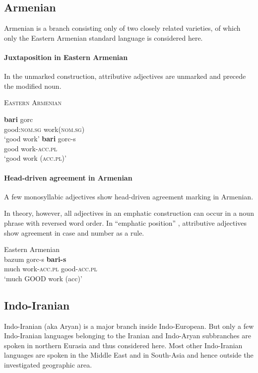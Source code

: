 \subsection{Armenian}
Armenian is a branch consisting only of two closely related varieties, of which only the Eastern Armenian standard language is considered here.

\paragraph{Juxtaposition in Eastern Armenian} 
In the unmarked construction, attributive adjectives are unmarked and precede the modified noun.
\begin{exe}
\ex \textsc{Eastern Armenian} \citep{ajello1998}
\begin{xlist}
\ex 
\gll	\textbf{bari} gorc\\
	good:\textsc{nom.sg} work(\textsc{nom.sg})\\
\glt	‘good work’
\ex 
\gll	\textbf{bari} gorc-s\\
	good work-\textsc{acc.pl}\\
\glt	‘good work (\textsc{acc.pl})’
\end{xlist}
\end{exe}

\paragraph{Head-driven agreement in Armenian}
A few monosyllabic adjectives show head-driven agreement marking in Armenian. 

In theory, however, all adjectives in an emphatic construction can occur in a noun phrase with reversed word order. In “emphatic position” \cite[224]{ajello1998}, attributive adjectives show agreement in case and number as a rule.
\begin{exe}
\ex \rm{Eastern Armenian \citep[224]{ajello1998}}\\
\gll	bazum gorc-s \textbf{bari-s}\\
	much work-\textsc{acc.pl} good-\textsc{acc.pl}\\
\glt	‘much GOOD work (acc)’
\end{exe}

\subsection{Indo-Iranian}
Indo-Iranian (aka Aryan) is a major branch inside Indo-European. But only a few Indo-Iranian languages belonging to the Iranian and Indo-Aryan subbranches are spoken in northern Eurasia and thus considered here. Most other Indo-Iranian languages are spoken in the Middle East and in South-Asia and hence outside the investigated geographic area. 

